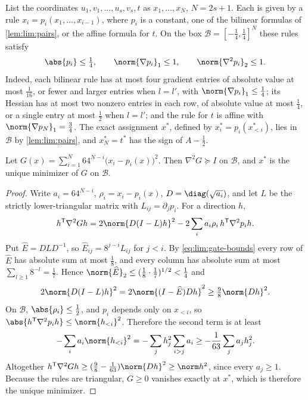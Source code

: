 List the coordinates $u_1,v_1,\ldots,u_s,v_s,t$ as $x_1,\ldots,x_N$, $N=2s+1$.
Each is given by a rule $x_i=p_i(x_1,\ldots,x_{i-1})$, where $p_i$ is a
constant, one of the bilinear formulas of \cref{lem:lim:pairs}, or the
affine formula for $t$. On the box $\mathcal B=[-\frac14,\frac14]^N$ these
rules satisfy
\begin{equation}\label{eq:lim:gate-bounds}
 \abs{p_i}\le\tfrac14,\qquad\norm{\nabla p_i}_1\le1,\qquad
 \norm{\nabla^2p_i}_2\le1 .
\end{equation}
Indeed, each bilinear rule has at most four gradient entries of absolute
value at most $\frac1{16}$, or fewer and larger entries when $l=l'$, with
$\norm{\nabla p_i}_1\le\frac14$; its Hessian has at most two nonzero entries
in each row, of absolute value at most $\frac14$, or a single entry at most
$\frac12$ when $l=l'$; and the rule for $t$ is affine with
$\norm{\nabla p_N}_1=\frac34$. The exact assignment $x^*$, defined by
$x_i^*=p_i(x_{<i}^*)$, lies in $\mathcal B$ by \cref{lem:lim:pairs}, and
$x_N^*=t^*$ has the sign of $A-\frac12$.

\begin{lemma}\label{lem:lim:gates}
Let $G(x)=\sum_{i=1}^N64^{N-i}\bigl(x_i-p_i(x)\bigr)^2$. Then
$\nabla^2G\succeq I$ on $\mathcal B$, and $x^*$ is the unique minimizer of $G$
on $\mathcal B$.
\end{lemma}

\begin{proof}
Write $a_i=64^{N-i}$, $\rho_i=x_i-p_i(x)$, $D=\diag(\sqrt{a_i})$, and let $L$
be the strictly lower-triangular matrix with $L_{ij}=\partial_jp_i$. For a
direction $h$,
\[
 h^{\mathsf T}\nabla^2Gh=2\norm{D(I-L)h}^2-2\sum_ia_i\rho_i\,h^{\mathsf T}\nabla^2p_ih .
\]
Put $\widehat E=DLD^{-1}$, so $\widehat E_{ij}=8^{j-i}L_{ij}$ for $j<i$. By
\eqref{eq:lim:gate-bounds} every row of $\widehat E$ has absolute sum at
most $\frac18$, and every column has absolute sum at most
$\sum_{l\ge1}8^{-l}=\frac17$. Hence
$\norm{\widehat E}_2\le(\frac18\cdot\frac17)^{1/2}<\frac14$ and
\[
 2\norm{D(I-L)h}^2=2\norm{(I-\widehat E)Dh}^2\ge\tfrac98\norm{Dh}^2 .
\]
On $\mathcal B$, $\abs{\rho_i}\le\frac12$, and $p_i$ depends only on
$x_{<i}$, so $\abs{h^{\mathsf T}\nabla^2p_ih}\le\norm{h_{<i}}^2$. Therefore the
second term is at least
\[
 -\sum_ia_i\norm{h_{<i}}^2=-\sum_jh_j^2\sum_{i>j}a_i\ge-\frac1{63}\sum_ja_jh_j^2 .
\]
Altogether $h^{\mathsf T}\nabla^2Gh\ge(\frac98-\frac1{63})\norm{Dh}^2\ge\norm h^2$,
since every $a_j\ge1$. Because the rules are triangular, $G\ge0$ vanishes
exactly at $x^*$, which is therefore the unique minimizer.
\end{proof}

